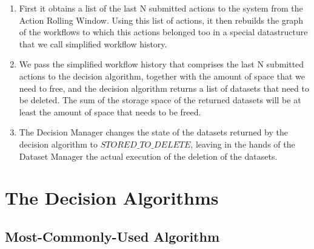 \begin{enumerate}
\item First it obtains a list of the last N submitted actions to the system from the Action Rolling Window. Using this list of actions, it then rebuilds the graph of the workflows to which this actions belonged too in a special datastructure that we call simplified workflow history.
\item We pass the simplified workflow history that comprises the last N submitted actions to the decision algorithm, together with the amount of space that we need to free, and the decision algorithm returns a list of datasets that need to be deleted. The sum of the storage space of the returned datasets will be at least the amount of space that needs to be freed.
\item The Decision Manager changes the state of the datasets returned by the decision algorithm to $STORED\_TO\_DELETE$, leaving in the hands of the Dataset Manager the actual execution of the deletion of the datasets.

\end{enumerate}

\section{The Decision Algorithms}
\subsection{Most-Commonly-Used Algorithm}





